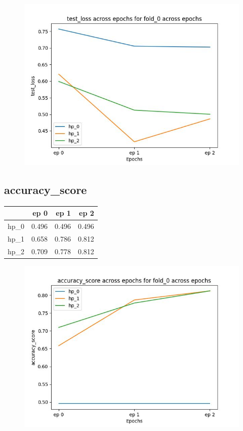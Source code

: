 \documentclass{article}
\begin{document}
\begin{figure}[H]
\includegraphics[scale = 0.75]{fold_0/test_loss}
\end{figure}
\subsection{accuracy\_score}
\begin{tabular}{lrrr}
\toprule
{} &   ep 0 &   ep 1 &   ep 2 \\
\midrule
hp\_0 &  0.496 &  0.496 &  0.496 \\
hp\_1 &  0.658 &  0.786 &  0.812 \\
hp\_2 &  0.709 &  0.778 &  0.812 \\
\bottomrule
\end{tabular}

\begin{figure}[H]
\includegraphics[scale = 0.75]{fold_0/accuracy_score}
\end{figure}
\end{document}
